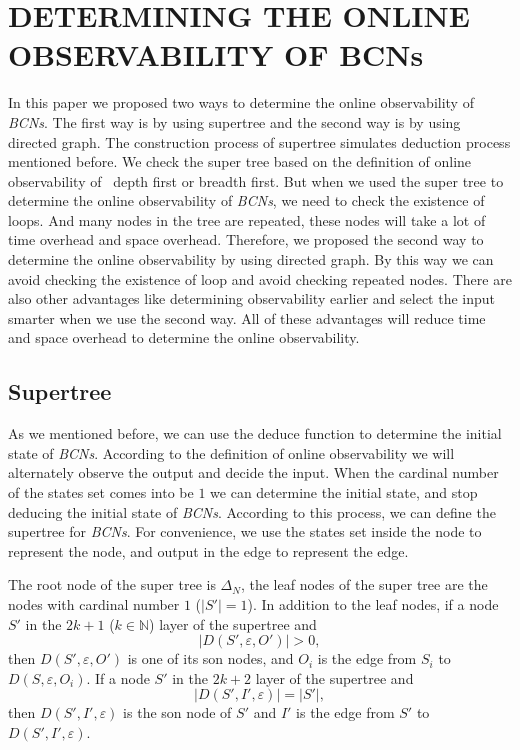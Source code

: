 \section{DETERMINING THE ONLINE OBSERVABILITY OF BCNs}

In this paper we proposed two ways to determine the online observability of {\em BCNs}. The first way is by using supertree and the second way is by using directed graph. The construction process of supertree simulates deduction process mentioned before. We check the super tree based on the definition of online observability of \BCNs\ depth first or breadth first. But when we used the super tree to determine the online observability of {\em BCNs}, we need to check the existence of loops. And many nodes in the tree are repeated, these nodes will take a lot of time overhead and space overhead. Therefore, we proposed the second way to determine the online observability by using directed graph. By this way we can avoid checking the existence of loop and avoid checking repeated nodes. There are also other advantages like determining observability earlier and select the input smarter when we use the second way. All of these advantages will reduce time and space overhead to determine the online observability.    

\subsection{Supertree} As we mentioned before, we can use the deduce function to determine the initial state of {\em BCNs}. According to the definition of online observability we will alternately observe the output and decide the input. When the  cardinal number of the states set comes into be $1$ we can determine the initial state, and stop deducing the initial state of {\em BCNs}. According to this process, we can define the supertree for {\em BCNs}. For convenience, we use the states set inside the node to represent the node, and output in the edge to represent the edge.
\begin{definition}
The root node of the super tree is $\Delta_N$, the leaf nodes of the super tree are the nodes with cardinal number $1$ ($|S'|=1$). In addition to the leaf nodes, if a node $S'$ in the $2k + 1$ ($k\in \mathbb{N}$) layer of the supertree and 
\[|D\left(S',\varepsilon, O'\right)|>0,\]
 then $D\left(S',\varepsilon, O'\right)$ is one of its son nodes, and $O_i$ is the edge from $S_i$ to $D\left(S,\varepsilon, O_i\right)$. If a node $S'$ in the $2k+2$ layer of the supertree and  
\[|D\left(S',I',\varepsilon\right)|=|S'|,\] 
then $D\left(S',I',\varepsilon\right)$ is the son node of $S'$ and $I'$ is the edge from $S'$ to $D\left(S',I',\varepsilon\right)$. 
\end{definition}

